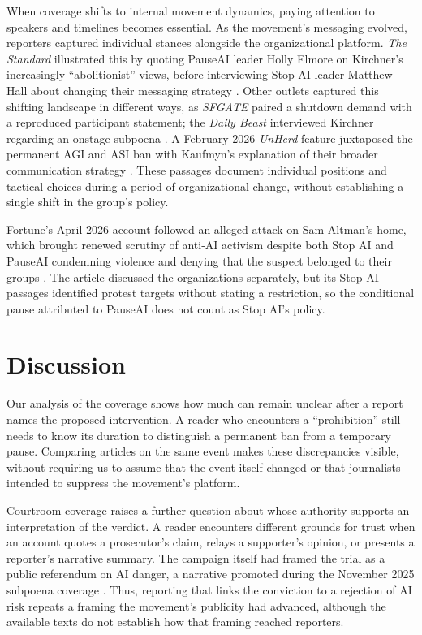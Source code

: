 \documentclass[11pt]{article}
\begin{document}
When coverage shifts to internal movement dynamics, paying attention to speakers and timelines becomes essential. As the movement's messaging evolved, reporters captured individual stances alongside the organizational platform. \textit{The Standard} illustrated this by quoting PauseAI leader Holly Elmore on Kirchner's increasingly ``abolitionist'' views, before interviewing Stop AI leader Matthew Hall about changing their messaging strategy \citep{standardprofile}. Other outlets captured this shifting landscape in different ways, as \textit{SFGATE} paired a shutdown demand with a reproduced participant statement; the \textit{Daily Beast} interviewed Kirchner regarding an onstage subpoena \citep{gateprofile,beast}. A February 2026 \textit{UnHerd} feature juxtaposed the permanent AGI and ASI ban with Kaufmyn's explanation of their broader communication strategy \citep{morgan}. These passages document individual positions and tactical choices during a period of organizational change, without establishing a single shift in the group's policy.

Fortune's April 2026 account followed an alleged attack on Sam Altman's home, which brought renewed scrutiny of anti-AI activism despite both Stop AI and PauseAI condemning violence and denying that the suspect belonged to their groups \citep{goldman}. The article discussed the organizations separately, but its Stop AI passages identified protest targets without stating a restriction, so the conditional pause attributed to PauseAI does not count as Stop AI's policy.

\section{Discussion}
Our analysis of the coverage shows how much can remain unclear after a report names the proposed intervention. A reader who encounters a ``prohibition'' still needs to know its duration to distinguish a permanent ban from a temporary pause. Comparing articles on the same event makes these discrepancies visible, without requiring us to assume that the event itself changed or that journalists intended to suppress the movement's platform.

Courtroom coverage raises a further question about whose authority supports an interpretation of the verdict. A reader encounters different grounds for trust when an account quotes a prosecutor's claim, relays a supporter's opinion, or presents a reporter's narrative summary. The campaign itself had framed the trial as a public referendum on AI danger, a narrative promoted during the November 2025 subpoena coverage \citep{subpoena,krans}. Thus, reporting that links the conviction to a rejection of AI risk repeats a framing the movement's publicity had advanced, although the available texts do not establish how that framing reached reporters.
\end{document}
